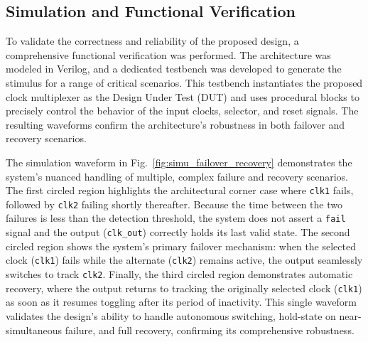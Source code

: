\documentclass[conference]{IEEEtran}
\begin{document}
\subsection{Simulation and Functional Verification}

To validate the correctness and reliability of the proposed design, a comprehensive functional verification was performed. The architecture was modeled in Verilog, and a dedicated testbench was developed to generate the stimulus for a range of critical scenarios. This testbench instantiates the proposed clock multiplexer as the Design Under Test (DUT) and uses procedural blocks to precisely control the behavior of the input clocks, selector, and reset signals. The resulting waveforms confirm the architecture's robustness in both failover and recovery scenarios.

The simulation waveform in Fig.~\ref{fig:simu_failover_recovery} demonstrates the system's nuanced handling of multiple, complex failure and recovery scenarios. The first circled region highlights the architectural corner case where \texttt{clk1} fails, followed by \texttt{clk2} failing shortly thereafter. Because the time between the two failures is less than the detection threshold, the system does not assert a \texttt{fail} signal and the output (\texttt{clk\_out}) correctly holds its last valid state. The second circled region shows the system's primary failover mechanism: when the selected clock (\texttt{clk1}) fails while the alternate (\texttt{clk2}) remains active, the output seamlessly switches to track \texttt{clk2}. Finally, the third circled region demonstrates automatic recovery, where the output returns to tracking the originally selected clock (\texttt{clk1}) as soon as it resumes toggling after its period of inactivity. This single waveform validates the design's ability to handle autonomous switching, hold-state on near-simultaneous failure, and full recovery, confirming its comprehensive robustness.
\end{document}
